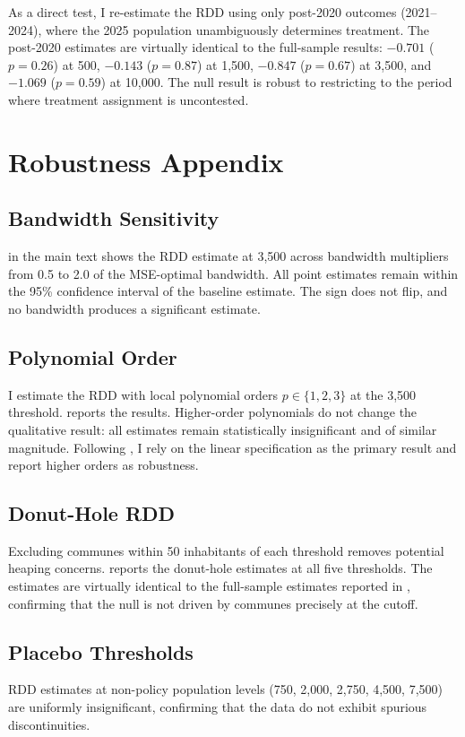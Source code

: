 \documentclass[12pt]{article}
\begin{document}
As a direct test, I re-estimate the RDD using only post-2020 outcomes (2021--2024), where the 2025 population unambiguously determines treatment. The post-2020 estimates are virtually identical to the full-sample results: $-0.701$ ($p = 0.26$) at 500, $-0.143$ ($p = 0.87$) at 1,500, $-0.847$ ($p = 0.67$) at 3,500, and $-1.069$ ($p = 0.59$) at 10,000. The null result is robust to restricting to the period where treatment assignment is uncontested.

\section{Robustness Appendix}
\label{app:robustness}

\subsection{Bandwidth Sensitivity}

 in the main text shows the RDD estimate at 3,500 across bandwidth multipliers from 0.5 to 2.0 of the MSE-optimal bandwidth. All point estimates remain within the 95\% confidence interval of the baseline estimate. The sign does not flip, and no bandwidth produces a significant estimate.

\subsection{Polynomial Order}

I estimate the RDD with local polynomial orders $p \in \{1, 2, 3\}$ at the 3,500 threshold.  reports the results. Higher-order polynomials do not change the qualitative result: all estimates remain statistically insignificant and of similar magnitude. Following \citet{gelman2019}, I rely on the linear specification as the primary result and report higher orders as robustness.



\subsection{Donut-Hole RDD}

Excluding communes within 50 inhabitants of each threshold removes potential heaping concerns.  reports the donut-hole estimates at all five thresholds. The estimates are virtually identical to the full-sample estimates reported in , confirming that the null is not driven by communes precisely at the cutoff.



\subsection{Placebo Thresholds}

RDD estimates at non-policy population levels (750, 2,000, 2,750, 4,500, 7,500) are uniformly insignificant, confirming that the data do not exhibit spurious discontinuities.
\end{document}
